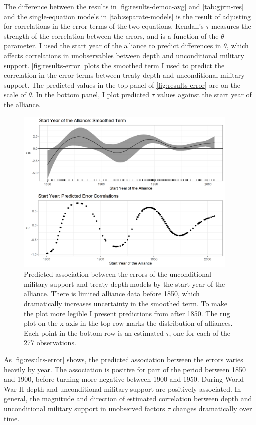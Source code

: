 \documentclass[12pt]{article}
\begin{document}
The difference between the results in \autoref{fig:results-democ-avg} and \autoref{tab:gjrm-res} and the single-equation models in \autoref{tab:separate-models} is the result of adjusting for correlations in the error terms of the two equations. 
Kendall's $\tau$ measures the strength of the correlation between the errors, and is a function of the $\theta$ parameter.
I used the start year of the alliance to predict differences in $\theta$, which affects correlations in unobservables between depth and unconditional military support. 
\autoref{fig:results-error} plots the smoothed term I used to predict the correlation in the error terms between treaty depth and unconditional military support. 
The predicted values in the top panel of \autoref{fig:results-error} are on the scale of $\theta$. 
In the bottom panel, I plot predicted $\tau$ values against the start year of the alliance. 


\begin{figure}[hbtp]
\centering
\includegraphics[width=0.95\textwidth]{../figures/results-error.png}
\caption{Predicted association between the errors of the unconditional military support and treaty depth models by the start year of the alliance. There is limited alliance data before 1850, which dramatically increases uncertainty in the smoothed term. To make the plot more legible I present predictions from after 1850. The rug plot on the x-axis in the top row marks the distribution of alliances. Each point in the bottom row is an estimated $\tau$, one for each of the 277 observations.}
\label{fig:results-error}
\end{figure}


As \autoref{fig:results-error} shows, the predicted association between the errors varies heavily by year. 
The association is positive for part of the period between 1850 and 1900, before turning more negative between 1900 and 1950. 
During World War II depth and unconditional military support are positively associated. 
In general, the magnitude and direction of estimated correlation between depth and unconditional military support in unobserved factors $\tau$ changes dramatically over time.  
\end{document}
